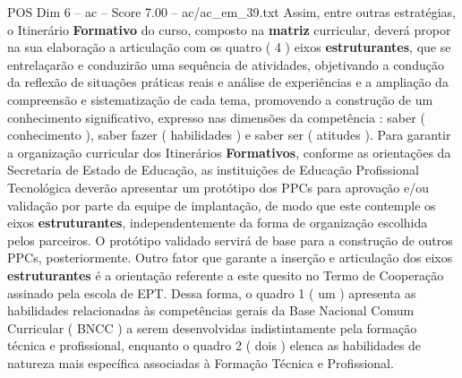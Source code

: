 \begin{textsample}{POS Dim 6 – ac – Score 7.00 – ac/ac\_em\_39.txt}
Assim, entre outras estratégias, o Itinerário \textbf{Formativo} do curso, composto na \textbf{matriz} curricular, deverá propor na sua elaboração a articulação com os quatro ( 4 ) eixos \textbf{estruturantes}, que se entrelaçarão e conduzirão uma sequência de atividades, objetivando a condução da reflexão de situações práticas reais e análise de experiências e a ampliação da compreensão e sistematização de cada tema, promovendo a construção de um conhecimento significativo, expresso nas dimensões da competência : saber ( conhecimento ), saber fazer ( habilidades ) e saber ser ( atitudes ).
Para garantir a organização curricular dos Itinerários \textbf{Formativos}, conforme as orientações da Secretaria de Estado de Educação, as instituições de Educação Profissional Tecnológica deverão apresentar um protótipo dos PPCs para aprovação e/ou validação por parte da equipe de implantação, de modo que este contemple os eixos \textbf{estruturantes}, independentemente da forma de organização escolhida pelos parceiros.
O protótipo validado servirá de base para a construção de outros PPCs, posteriormente.
Outro fator que garante a inserção e articulação dos eixos \textbf{estruturantes} é a orientação referente a este quesito no Termo de Cooperação assinado pela escola de EPT.
Dessa forma, o quadro 1 ( um ) apresenta as habilidades relacionadas às competências gerais da Base Nacional Comum Curricular ( BNCC ) a serem desenvolvidas indistintamente pela formação técnica e profissional, enquanto o quadro 2 ( dois ) elenca as habilidades de natureza mais específica associadas à Formação Técnica e Profissional.

\end{textsample}

